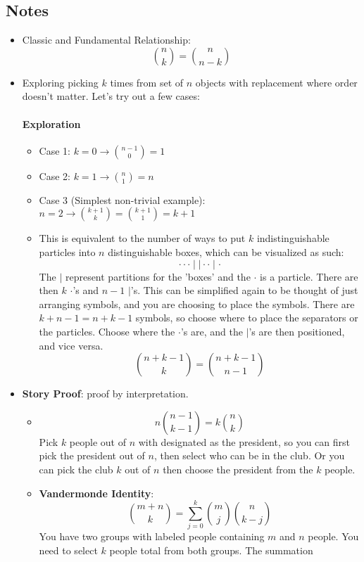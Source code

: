 \documentclass[11pt, oneside]{article}   	%
\begin{document}
	\subsection{Notes}
	\begin{itemize}
		\item Classic and Fundamental Relationship: \[ \binom{n}{k} = \binom{n}{n-k} \]
		\item Exploring picking $k$ times from set of $n$ objects with replacement where order doesn't matter. Let's try out a few cases:
		\paragraph{Exploration}
		\begin{itemize}
			\item Case 1: $k = 0 \rightarrow \binom{n-1}{0} = 1$
			\item Case 2: $k = 1 \rightarrow \binom{n}{1} = n$
			\item Case 3 (Simplest non-trivial example): $n = 2 \rightarrow \binom{k+1}{k} = \binom{k+1}{1} = k + 1$
			\item This is equivalent to the number of ways to put $k$ indistinguishable particles into $n$ distinguishable boxes, which can be visualized as such: \[ \cdot \cdot \cdot \mid \mid \cdot \cdot \mid \cdot \]
			The $\mid$ represent partitions for the 'boxes' and the $\cdot$ is a particle. There are then $k$ $\cdot$'s and $n-1$ $\mid$'s. This can be simplified again to be thought of just arranging symbols, and you are choosing to place
			the symbols. There are $k + n - 1 = n + k -1$ symbols, so choose where to place the separators or the particles. Choose where the $\cdot$'s are, and the $\mid$'s are then positioned, and vice versa. \[ \binom{n + k - 1}{k} = \binom{n + k - 1}{n - 1} \]
		\end{itemize}
		\item \textbf{Story Proof}: proof by interpretation.
		\begin{itemize}
			\item \[ n \binom{n - 1}{k - 1} = k \binom{n}{k} \] Pick $k$ people out of $n$ with designated as the president, so you can first pick the president out of $n$, then select who can be in the club. Or you can pick the club $k$ out of $n$ then choose the president from the $k$ people.
			\item \textbf{Vandermonde Identity}: \[ \binom{m + n}{k} = \sum_{j = 0}^{k} \binom{m}{j} \binom{n}{k-j} \] You have two groups with labeled people containing $m$ and $n$ people. You need to select $k$ people total from both groups. The summation

\end{itemize}
\end{itemize}
\end{document}
